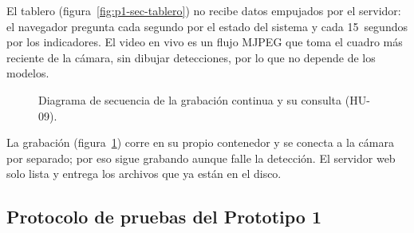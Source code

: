 El tablero (figura~\ref{fig:p1-sec-tablero}) no recibe datos empujados
por el servidor: el navegador pregunta cada segundo por el estado del
sistema y cada 15~segundos por los indicadores. El video en vivo es un
flujo MJPEG que toma el cuadro más reciente de la cámara, sin dibujar
detecciones, por lo que no depende de los modelos.

\begin{figure}[htbp]
  \centering
  \caption{Diagrama de secuencia de la grabación continua y su consulta
           (HU-09).}
  \label{fig:p1-sec-grabacion}
\end{figure}

La grabación (figura~\ref{fig:p1-sec-grabacion}) corre en su propio
contenedor y se conecta a la cámara por separado; por eso sigue grabando
aunque falle la detección. El servidor web solo lista y entrega los
archivos que ya están en el disco.

\FloatBarrier
\subsection{Protocolo de pruebas del Prototipo 1}
\label{sec:pruebas-p1}

